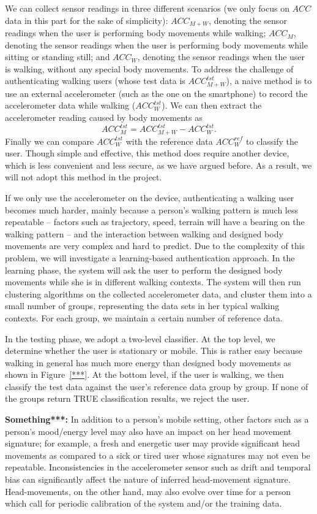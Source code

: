 We can collect sensor readings in three different scenarios (we only focus on $ACC$ data in this part for the sake of simplicity): ${ACC_{M+W}}$, denoting the sensor readings when the user is performing body movements while walking; ${ACC_{M}}$, denoting the sensor readings when the user is performing body movements while sitting or standing still; and ${ACC_{W}}$, denoting the sensor readings when the user is walking, without any special body movements. To address the challenge of authenticating walking users (whose test data is $ACC_{M+W}^{tst}$), a naive
method is to use an external accelerometer (such as the one on the smartphone) to record the accelerometer data while walking ($ACC_{W}^{tst}$). We can then extract the accelerometer reading caused by body movements as $$ ACC_{M}^{tst} = ACC_{M+W}^{tst} - ACC_{W}^{tst}.$$ Finally we can compare $ACC_{W}^{tst}$ with the reference data $ACC_{W}^{ref}$ to classify the user. Though simple and effective, this method does require another device, which is less convenient and less secure, as we have argued before. As a result, we will not adopt this method in the project.

If we only use the accelerometer on the device, authenticating a walking user becomes much harder, mainly because a person's walking pattern is much less repeatable -- factors such as trajectory, speed, terrain will have a bearing on the walking pattern -- and the interaction between walking and designed body movements are very complex and hard to predict. Due to the complexity of this problem, we will investigate a learning-based authentication approach. In the learning phase, the system will ask the user to perform the designed body movements while she is in different walking contexts. The system will then run clustering algorithms on the collected accelerometer data, and cluster them into a small number of groups, representing the data sets in her typical walking contexts. For each group, we maintain a certain number of reference data.

In the testing phase, we adopt a two-level classifier. At the top level, we determine whether the user is stationary or mobile. This is rather easy because walking in general has much more energy than designed body movements as shown in Figure~\ref{***}. At the bottom level, if the user is walking, we then classify the test data against the user's reference data group by group. If none of the groups return TRUE classification results, we reject the user.


\vspace{4pt}\textbf{Something***:} In addition to a person's mobile setting, other factors such as a person's mood/energy level may also have an impact on her head movement signature; for example, a fresh and energetic user may provide significant
head movements as compared to a sick or tired user whose signatures may not
even be repeatable. Inconsistencies in the accelerometer sensor such as drift and temporal bias can
significantly affect the nature of inferred head-movement signature.
Head-movements, on the other hand, may also evolve over time for a person
which call for periodic calibration of the system and/or the training data.

